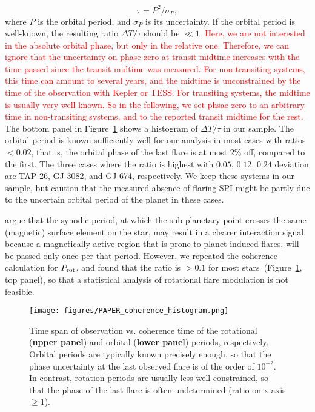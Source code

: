 \documentclass[twocolumn]{aastex631}
\begin{document}
\begin{equation}
    \tau = P^2 / \sigma_P,
\end{equation}
where $P$ is the orbital period, and $\sigma_P$ is its uncertainty.
If the orbital period is well-known, the resulting ratio $\Delta T/\tau$ should be $\ll 1$. \textcolor{red}{Here, we are not interested in the absolute orbital phase, but only in the relative one. Therefore, we can ignore that the uncertainty on phase zero at transit midtime increases with the time passed since the transit midtime was measured. For non-transiting systems, this time can amount to several years, and the midtime is unconstrained by the time of the observation with Kepler or TESS. For transiting systems, the midtime is usually very well known. So in the following, we set phsae zero to an arbitrary time in non-transiting systems, and to the reported transit midtime for the rest.} The bottom panel in Figure~\ref{fig:coherence_hist} shows a histogram of $\Delta T/\tau$ in our sample. The orbital period is known sufficiently well for our analysis in most cases with ratios $<0.02$, that is, the orbital phase of the last flare is at most $2\%$ off, compared to the first. The three cases where the ratio is highest with $0.05$, $0.12$, $0.24$ deviation are TAP 26, GJ 3082, and GJ 674, respectively. We keep these systems in our sample, but caution that the measured absence of flaring SPI might be partly due to the uncertain orbital period of the planet in these cases.


\citet{fischer2019timevariable} argue that the synodic period, at which the sub-planetary point crosses the same (magnetic) surface element on the star, may result in a clearer interaction signal, because a magnetically active region that is prone to planet-induced flares, will be passed only once per that period. However, we repeated the coherence calculation for $P_{\rm rot}$, and found that the ratio is $>0.1$ for most stars~(Figure~\ref{fig:coherence_hist}, top panel), so that a statistical analysis of rotational flare modulation is not feasible. 

\begin{figure}[ht!]
    \begin{centering}
        \texttt{[image: figures/PAPER\_coherence\_histogram.png]}
        \caption{
           Time span of observation vs. coherence time of the rotational (\textbf{upper panel}) and orbital (\textbf{lower panel}) periods, respectively. Orbital periods are typically known precisely enough, so that the phase uncertainty at the last observed flare is of the order of $10^{-2}$. In contrast, rotation periods are usually less well constrained, so that the phase of the last flare is often undetermined (ratio on x-axis $\geq 1$).
        }
        \label{fig:coherence_hist}
    \end{centering}
\end{figure}
\end{document}
